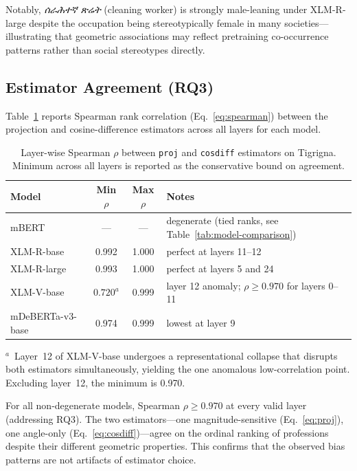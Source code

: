\documentclass[10pt]{article}
\begin{document}
Notably, \textit{ሰራሕተኛ ጽሬት} (cleaning worker) is strongly male-leaning
under XLM-R-large despite the occupation being stereotypically female in many
societies---illustrating that geometric associations may reflect pretraining
co-occurrence patterns rather than social stereotypes directly.

\subsection{Estimator Agreement (RQ3)}
\label{sec:agreement}

Table~\ref{tab:spearman} reports Spearman rank correlation (Eq.~\ref{eq:spearman})
between the projection and cosine-difference estimators across all layers for
each model.

\begin{table}[H]
\centering
\caption{Layer-wise Spearman $\rho$ between \texttt{proj} and \texttt{cosdiff}
         estimators on Tigrigna. Minimum across all layers is reported as
         the conservative bound on agreement.}
\label{tab:spearman}
\small
\begin{tabular}{lccl}
\toprule
\textbf{Model} & \textbf{Min $\rho$} & \textbf{Max $\rho$} & \textbf{Notes} \\
\midrule
mBERT            & ---         & ---   & degenerate (tied ranks, see Table~\ref{tab:model-comparison}) \\
XLM-R-base       & 0.992       & 1.000 & perfect at layers 11--12 \\
XLM-R-large      & 0.993       & 1.000 & perfect at layers 5 and 24 \\
XLM-V-base       & $0.720^{a}$ & 0.999 & layer 12 anomaly; $\rho \geq 0.970$ for layers 0--11 \\
mDeBERTa-v3-base & 0.974       & 0.999 & lowest at layer 9 \\
\bottomrule
\end{tabular}
\begin{minipage}{\linewidth}
\smallskip\footnotesize
$^{a}$~Layer~12 of XLM-V-base undergoes a representational collapse that
disrupts both estimators simultaneously, yielding the one anomalous low-correlation
point. Excluding layer~12, the minimum is 0.970.
\end{minipage}
\end{table}

For all non-degenerate models, Spearman $\rho \geq 0.970$ at every valid layer
(addressing RQ3). The two estimators---one magnitude-sensitive
(Eq.~\ref{eq:proj}), one angle-only (Eq.~\ref{eq:cosdiff})---agree on the
ordinal ranking of professions despite their different geometric properties.
This confirms that the observed bias patterns are not artifacts of estimator
choice.
\end{document}
